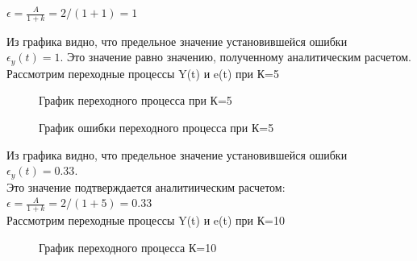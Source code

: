 \documentclass[a4paper, 11pt]{article}
\begin{document}
\newpage 

\large{$\epsilon=\frac {A}{1+k} = 2/(1+1) = 1$}

Из графика видно, что предельное значение установившейся ошибки \\ $\epsilon_y(t) = 1$. Это значение равно значению, полученному аналитическим расчетом.\\

Рассмотрим переходные процессы Y(t) и e(t) при К=5
\begin{figure}[h!]
    \caption{График переходного процесса при К=5}
    \label{four}
\end{figure}

\begin{figure}[h!]
    \caption{График ошибки переходного процесса при К=5}
    \label{tree}
\end{figure}

Из графика видно, что предельное значение установившейся ошибки $\epsilon_y(t)=0.33$.\\
Это значение подтверждается аналитиическим расчетом: $\epsilon=\frac {A}{1+k} = 2/(1+5) = 0.33$\\

Рассмотрим переходные процессы Y(t) и e(t) при К=10
\begin{figure}[h!]
    \caption{График переходного процесса К=10}
    \label{four}
\end{figure}
\end{document}

